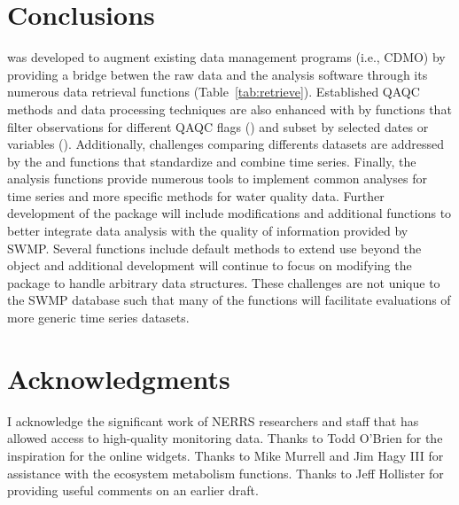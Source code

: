 \section{Conclusions}

 was developed to augment existing data management programs (i.e., CDMO) by providing a bridge betwen the raw data and the analysis software through its numerous data retrieval functions (Table~\ref{tab:retrieve}).  Established QAQC methods and data processing techniques are also enhanced with  by functions that filter observations for different QAQC flags () and subset by selected dates or variables ().  Additionally, challenges comparing differents datasets are addressed by the  and  functions that standardize and combine time series.  Finally, the analysis functions provide numerous tools to implement common analyses for time series and more specific methods for water quality data.  Further development of the package will include modifications and additional functions to better integrate data analysis with the quality of information provided by SWMP.  Several functions include default methods to extend use beyond the  object and additional development will continue to focus on modifying the package to handle arbitrary data structures.  These challenges are not unique to the SWMP database such that many of the functions will facilitate evaluations of more generic time series datasets.  

\section{Acknowledgments}

I acknowledge the significant work of NERRS researchers and staff that has allowed access to high-quality monitoring data.  Thanks to Todd O'Brien for the inspiration for the online widgets. Thanks to Mike Murrell and Jim Hagy III for assistance with the ecosystem metabolism functions. Thanks to Jeff Hollister for providing useful comments on an earlier draft.



\address{Marcus W Beck\\
  ORISE Research Participation Program\\
  USEPA National Health and Environmental Effects Research Laboratory, Gulf Ecology Division\\
  1 Sabine Island Drive, Gulf Breeze, FL 32651\\
  USA\\}
